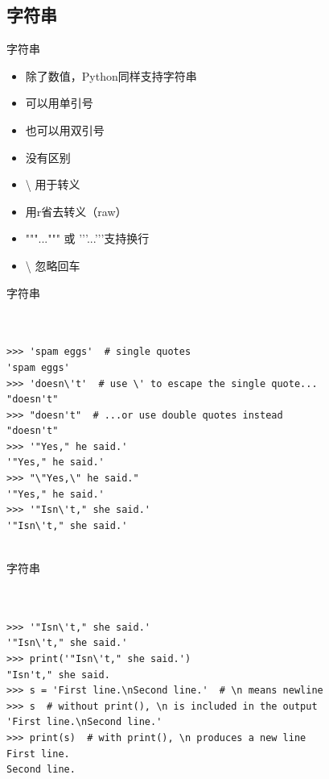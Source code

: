 \documentclass{beamer}
\begin{document}
\subsection{字符串}

\begin{frame}[t]{字符串}

    \begin{itemize}
        \item 除了数值，Python同样支持字符串
        \item 可以用单引号
        \item 也可以用双引号
        \item 没有区别
        \item \textbackslash{} 用于转义
        \item 用r省去转义（raw）
        \item """...""" 或 '{}'{}'...'{}'{}'支持换行 
        \item \textbackslash{} 忽略回车
    \end{itemize}

\end{frame}


\begin{frame}[t,fragile]{字符串}


\begin{verbatim}


>>> 'spam eggs'  # single quotes
'spam eggs'
>>> 'doesn\'t'  # use \' to escape the single quote...
"doesn't"
>>> "doesn't"  # ...or use double quotes instead
"doesn't"
>>> '"Yes," he said.'
'"Yes," he said.'
>>> "\"Yes,\" he said."
'"Yes," he said.'
>>> '"Isn\'t," she said.'
'"Isn\'t," she said.'


\end{verbatim}


\end{frame}




\begin{frame}[t,fragile]{字符串}


\begin{verbatim}


>>> '"Isn\'t," she said.'
'"Isn\'t," she said.'
>>> print('"Isn\'t," she said.')
"Isn't," she said.
>>> s = 'First line.\nSecond line.'  # \n means newline
>>> s  # without print(), \n is included in the output
'First line.\nSecond line.'
>>> print(s)  # with print(), \n produces a new line
First line.
Second line.


\end{verbatim}


\end{frame}
\end{document}
